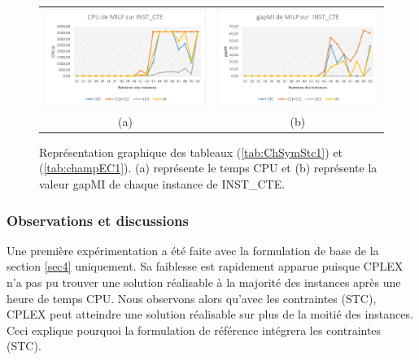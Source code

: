 {\begin{figure}[H]
	\centering
	\begin{tabular}{c c}
		\includegraphics[width=9cm]{images_these/CPU_MILP_INST_CTE.pdf}&
		\includegraphics[width=9cm]{images_these/gapMI_MILP_INST_CTE.pdf}
		\\
		(a) & (b)
	\end{tabular}
	\caption[Représentation graphique du CPU et du gap des tableaux (\ref{tab:ChSymStc1}) et (\ref{tab:champEC1})]{Représentation graphique des tableaux (\ref{tab:ChSymStc1}) et (\ref{tab:champEC1}). (a) représente le temps CPU et (b) représente la valeur gapMI de chaque instance de INST\_CTE.}\label{gapMI_cpu_RMILP_INST_CTE}
\end{figure}


\subsubsection{Observations et discussions}
Une première expérimentation a été faite avec la formulation de base de la section \ref{sec4} uniquement.  Sa faiblesse est rapidement apparue puisque CPLEX n'a pas pu trouver une solution réalisable à la majorité des instances après une heure de temps CPU. Nous observons alors qu'avec les contraintes (STC), CPLEX peut atteindre une solution réalisable sur plus de la moitié des instances. Ceci explique pourquoi la formulation de référence intégrera les contraintes (STC). %


}
